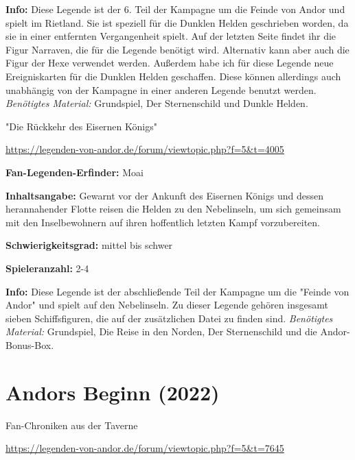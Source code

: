 {\textbf{Info:}
Diese Legende ist der 6. Teil der Kampagne um die Feinde von Andor und spielt im Rietland. Sie ist speziell für die Dunklen Helden geschrieben worden, da sie in einer entfernten Vergangenheit spielt. Auf der letzten Seite findet ihr die Figur Narraven, die für die Legende benötigt wird. Alternativ kann aber auch die Figur der Hexe verwendet werden.
Außerdem habe ich für diese Legende neue Ereigniskarten für die Dunklen Helden geschaffen. Diese können allerdings auch unabhängig von der Kampagne in einer anderen Legende benutzt werden.
\textit{Benötigtes Material:} Grundspiel, Der Sternenschild und Dunkle Helden.









\begin{center}
    "Die Rückkehr des Eisernen Königs"

    \url{https://legenden-von-andor.de/forum/viewtopic.php?f=5&t=4005}
\end{center}


\textbf{Fan-Legenden-Erfinder:} Moai

\textbf{Inhaltsangabe:}
Gewarnt vor der Ankunft des Eisernen Königs und dessen herannahender Flotte reisen die Helden zu den Nebelinseln, um sich gemeinsam mit den Inselbewohnern auf ihren hoffentlich letzten Kampf vorzubereiten.

\textbf{Schwierigkeitsgrad:} mittel bis schwer

\textbf{Spieleranzahl:} 2-4

\textbf{Info:}
Diese Legende ist der abschließende Teil der Kampagne um die "Feinde von Andor" und spielt auf den Nebelinseln.
Zu dieser Legende gehören insgesamt sieben Schiffsfiguren, die auf der zusätzlichen Datei zu finden sind.
\textit{Benötigtes Material:} Grundspiel, Die Reise in den Norden, Der Sternenschild und die Andor-Bonus-Box.









\newpage
\section{Andors Beginn (2022)}


\begin{center}
    Fan-Chroniken aus der Taverne

    \url{https://legenden-von-andor.de/forum/viewtopic.php?f=5&t=7645}
\end{center}

}
